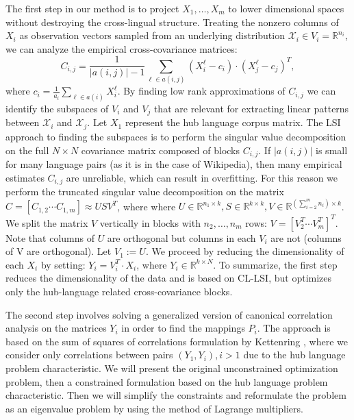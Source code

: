 \documentclass[twoside,11pt]{article}
\newcommand{\RR}{\mathbb{R}}
\begin{document}
The first step in our method is to project $X_1, \ldots, X_m$ to lower dimensional spaces without destroying the cross-lingual structure. Treating the nonzero columns of $X_i$ as observation vectors sampled from an underlying distribution $\mathcal{X}_i \in V_i = \RR^{n_i}$, we can analyze the empirical cross-covariance matrices:
$$C_{i,j} = \frac{1}{|a(i,j)|-1 }\sum_{\ell \in a(i,j)} (X_i^{\ell} - c_i)\cdot (X_j^{\ell} - c_j)^T,$$
 where $c_i = \frac{1}{a_i} \sum_{\ell \in a(i)}X_i^{\ell}$. By finding low rank approximations of $C_{i,j}$ we can identify the subspaces of $V_i$ and $V_j$ that are relevant for extracting linear patterns between $\mathcal{X}_i$ and $\mathcal{X}_j$. Let $X_1$ represent the hub language corpus matrix. The LSI approach to finding the subspaces is to perform the singular value decomposition on the full $N \times N$ covariance matrix composed of blocks $C_{i,j}$. If $|a(i,j)|$ is small for many language pairs (as it is in the case of Wikipedia), then many empirical estimates $C_{i,j}$ are unreliable, which can result in overfitting. For this reason we perform the truncated singular value decomposition on the matrix $C = [C_{1,2}  \cdots  C_{1,m}] \approx U S V^T$, where where $U \in \RR^{n_1 \times k}, S \in \RR^{k \times k}, V \in \RR^{(\sum_{i=2}^m n_i) \times k}$. We split the matrix $V$ vertically in blocks with $n_2, \ldots, n_m$ rows: $V = [V_2^T  \cdots  V_m^T]^T$. Note that columns of $U$ are orthogonal but columns in each $V_i$ are not (columns of V are orthogonal). Let $V_1 := U$. We proceed by reducing the dimensionality of each $X_i$ by setting: $Y_i = V_i^T \cdot X_i$, where $Y_i \in \RR^{k\times N}$. To summarize, the first step reduces the dimensionality of the data and is based on CL-LSI, but optimizes only the hub-language related cross-covariance blocks.

The second step involves solving a generalized version of canonical correlation analysis on the matrices $Y_i$ in order to find the mappings $P_i$. The approach is based on the sum of squares of correlations formulation by Kettenring \cite{Kettenring}, where we consider only correlations between pairs $(Y_1, Y_i), i >1$ due to the hub language problem characteristic.
We will present the original unconstrained optimization problem, then a constrained formulation based on the hub language problem characteristic. Then we will simplify the constraints and reformulate
the problem as an eigenvalue problem by using the method of Lagrange multipliers.
\end{document}
